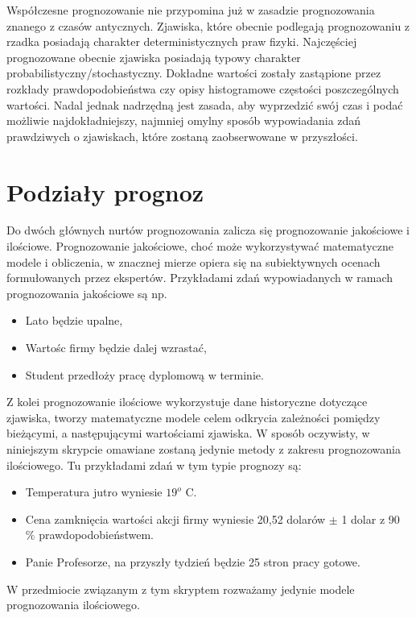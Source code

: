 \documentclass[10pt,a4paper]{book}
\begin{document}
Współczesne prognozowanie nie przypomina już w zasadzie prognozowania znanego z czasów antycznych. Zjawiska, które obecnie podlegają prognozowaniu z rzadka posiadają charakter deterministycznych praw fizyki. Najczęściej prognozowane obecnie zjawiska posiadają typowy charakter probabilistyczny/stochastyczny. Dokładne wartości zostały zastąpione przez rozkłady prawdopodobieństwa czy opisy histogramowe częstości poszczególnych wartości. Nadal jednak nadrzędną jest zasada, aby wyprzedzić swój czas i podać możliwie najdokładniejszy, najmniej omylny sposób wypowiadania zdań prawdziwych o zjawiskach, które zostaną zaobserwowane w przyszłości.

\section{Podziały prognoz}

Do dwóch głównych nurtów prognozowania zalicza się \citep[Ch. 1]{montgomery2015introduction} prognozowanie jakościowe i ilościowe. Prognozowanie jakościowe, choć może wykorzystywać matematyczne modele i obliczenia, w znacznej mierze opiera się na subiektywnych ocenach formułowanych przez ekspertów. Przykładami zdań wypowiadanych w ramach prognozowania jakościowe są np.
\begin{itemize}
\item Lato będzie upalne,
\item Wartośc firmy będzie dalej wzrastać,
\item Student przedłoży pracę dyplomową w terminie.
\end{itemize}
Z kolei prognozowanie ilościowe wykorzystuje dane historyczne dotyczące zjawiska, tworzy matematyczne modele celem odkrycia zależności pomiędzy bieżącymi, a następującymi wartościami zjawiska. W sposób oczywisty, w niniejszym skrypcie omawiane zostaną jedynie metody z zakresu prognozowania ilościowego. Tu przykładami zdań w tym typie prognozy są:
\begin{itemize}
\item Temperatura jutro wyniesie $19^o$ C.
\item Cena zamknięcia wartości akcji firmy wyniesie 20,52 dolarów $\pm$ 1
dolar z 90 $\%$ prawdopodobieństwem.
\item Panie Profesorze, na przyszły tydzień będzie 25 stron pracy gotowe.
\end{itemize}
W przedmiocie związanym z tym skryptem rozważamy jedynie modele prognozowania ilościowego.
\end{document}
